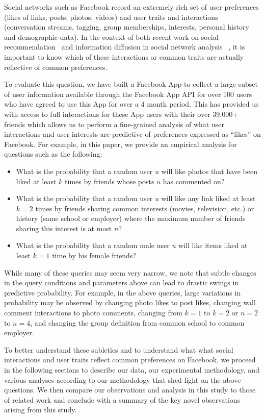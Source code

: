 \label{sec:introduction}

Social networks such as Facebook record an extremely rich set of user
preferences (likes of links, posts, photos, videos) and user traits
and interactions (conversation streams, tagging, group memberships,
interests, personal history and demographic data).  In the context of
both recent work on social recommendation~\cite{sorec,ste,lla} and
information diffusion in social network analysis
~\cite{lerman2010information,Romero2011hashtag,Bakshy2012chamber}, 
it is important to know which of these interactions or common traits
are actually reflective of common preferences.

To evaluate this question, we have built a Facebook App to collect a
large subset of user information available through the Facebook App
API for over 100 users who have agreed to use this App for over a 4
month period.  This has provided us with access to full interactions
for these App users with their over 39,000+ friends which allows us to
perform a fine-grained analysis of what user interactions
and user interests are predictive of preferences 
expressed as ``likes'' on Facebook.  For example, in this paper,
we provide an empirical analysis for questions such as the following:
\begin{itemize}
\item What is the probability that a random user $u$ will like
photos that have been liked at least $k$ times by friends whose
posts $u$ has commented on?
\item What is the probability that a random user $u$ will like any
link liked at least $k=2$ times by friends sharing common interests
(movies, television, etc.) or history (same school or employer) where
the maximum number of friends sharing this interest is at most $n$?
\item What is the probability that a random male user $u$ 
will like items liked at least $k=1$ time by his female friends?
\end{itemize}

While many of these queries may seem very narrow, we note that subtle
changes in the query conditions and parameters above can lead to
drastic swings in predictive probability.  For example, in the above
queries, large variations in probability may be 
observed by changing photo likes to post likes, changing
wall comment interactions to photo comments, changing from $k=1$ to
$k=2$ or $n=2$ to $n=4$, and changing the group definition from common
school to common employer.

To better understand these subleties and to understand what what
social interactions and user traits reflect common preferences on
Facebook, we proceed in the following sections to describe our data,
our experimental methodology, and various analyses according to our
methodology that shed light on the above questions.  We then compare
our observations and analysis in this study to those of related work
and conclude with a summary of the key novel observations arising
from this study.


